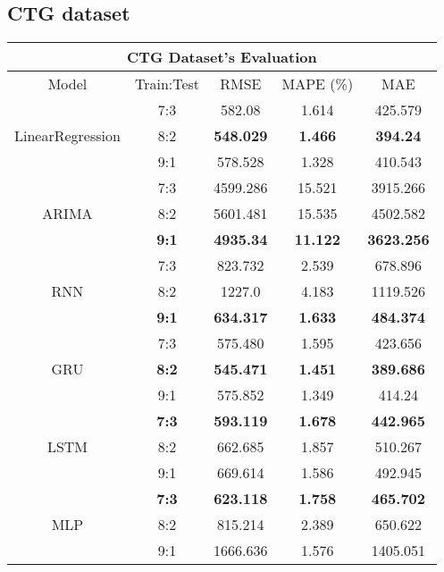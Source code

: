 \documentclass{ieeeojies}
\begin{document}
\subsection{CTG dataset}
\begin{table}[H]
    \centering
    \renewcommand{\arraystretch}{1.1}
    \begin{tabular}{|c|c|c|c|c|}
         \hline
         \multicolumn{5}{|c|}{\textbf{CTG Dataset's Evaluation}}\\
         \hline
         \centering Model & Train:Test & RMSE & MAPE (\%) & MAE\\
         \hline
         \multirow{3}{*}{LinearRegression} 
         & 7:3 & 582.08 & 1.614 & 425.579 \\ 
         & 8:2 & \textbf{548.029} & \textbf{1.466} & \textbf{394.24} \\ 
         & 9:1 & 578.528 & 1.328 & 410.543\\
         \hline
         \multirow{3}{*}{ARIMA} 
         & 7:3 & 4599.286 & 15.521 & 3915.266\\ 
         & 8:2 & 5601.481 & 15.535 & 4502.582 \\ 
         & \textbf{9:1} & \textbf{4935.34} & \textbf{11.122} & \textbf{3623.256}\\
         \hline
         \multirow{3}{*}{RNN} 
         & 7:3 & 823.732 & 2.539 & 678.896 \\ 
         & 8:2 & 1227.0 & 4.183 & 1119.526 \\ 
         & \textbf{9:1} & \textbf{634.317}  & \textbf{1.633} & \textbf{484.374}\\
         \hline
         \multirow{3}{*}{GRU} 
         & 7:3 &  575.480 &  1.595 & 423.656 \\ 
         & \textbf{8:2} &  \textbf{545.471} & \textbf{1.451} & \textbf{389.686} \\ 
         & 9:1 & 575.852  & 1.349 & 414.24\\
         \hline
         \multirow{3}{*}{LSTM} 
         & \textbf{7:3} & \textbf{593.119} & \textbf{1.678} & \textbf{442.965} \\ 
         & 8:2 & 662.685 & 1.857 & 510.267 \\ 
         & 9:1 & 669.614 & 1.586 & 492.945\\
         \hline
         \multirow{3}{*}{MLP} 
         & \textbf{7:3} & \textbf{623.118} & \textbf{1.758} & \textbf{465.702} \\ 
         & 8:2 &	815.214 & 2.389 & 650.622 \\ 
         & 9:1 & 1666.636 & 1.576 & 1405.051\\

\end{tabular}
\end{table}
\end{document}
